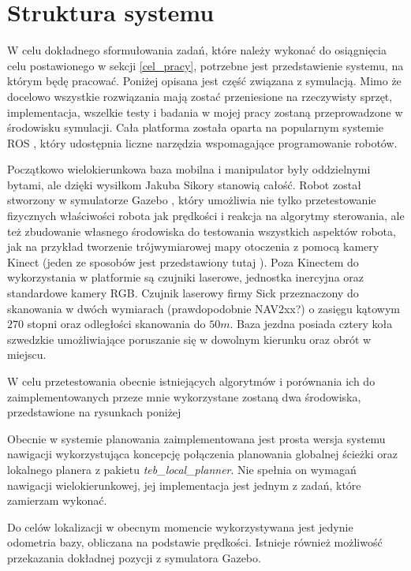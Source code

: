 \section{Struktura systemu}
\label{struktura_systemu}

W celu dokładnego sformułowania zadań, które należy wykonać do osiągnięcia celu postawionego w sekcji \ref{cel_pracy}, potrzebne jest przedstawienie systemu, na którym będę pracować. 
Poniżej opisana jest część związana z symulacją.
Mimo że docelowo wszystkie rozwiązania mają zostać przeniesione na rzeczywisty sprzęt, implementacja, wszelkie testy i badania w mojej pracy zostaną przeprowadzone w środowisku symulacji. 
Cała platforma została oparta na popularnym systemie ROS \cite{ros}, który udostępnia liczne narzędzia wspomagające programowanie robotów.

Początkowo wielokierunkowa baza mobilna i manipulator były oddzielnymi bytami, ale dzięki wysiłkom Jakuba Sikory \cite{jsikora-bsc-20-twiki} stanowią całość.
Robot został stworzony w symulatorze Gazebo \cite{gazebo}, który umożliwia nie tylko przetestowanie fizycznych właściwości robota jak prędkości i reakcja na algorytmy sterowania, ale też zbudowanie własnego środowiska do testowania wszystkich aspektów robota, jak na przykład tworzenie trójwymiarowej mapy otoczenia z pomocą kamery Kinect (jeden ze sposobów jest przedstawiony tutaj \cite{kinect_setup}).
Poza Kinectem do wykorzystania w platformie są czujniki laserowe, jednostka inercyjna oraz standardowe kamery RGB.
Czujnik laserowy firmy Sick przeznaczony do skanowania w dwóch wymiarach (prawdopodobnie NAV2xx?) \cite{lidar} o zasięgu kątowym $270$ stopni oraz odległości skanowania do $50m$. 
Baza jezdna posiada cztery koła szwedzkie umożliwiające poruszanie się w dowolnym kierunku oraz obrót w miejscu.



W celu przetestowania obecnie istniejących algorytmów i porównania ich do zaimplementowanych przeze mnie wykorzystane zostaną dwa środowiska, przedstawione na rysunkach poniżej

Obecnie w systemie planowania zaimplementowana jest prosta wersja systemu  nawigacji wykorzystująca koncepcję połączenia planowania globalnej ścieżki oraz lokalnego planera z pakietu \textit{teb\_local\_planner}. 
Nie spełnia on wymagań nawigacji wielokierunkowej, jej implementacja jest jednym z zadań, które zamierzam wykonać.

Do celów lokalizacji w obecnym momencie wykorzystywana jest jedynie odometria bazy, obliczana na podstawie prędkości. Istnieje również możliwość przekazania dokładnej pozycji z symulatora Gazebo.





